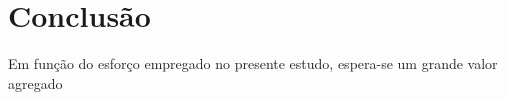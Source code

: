 \section{Conclusão}
\label{cap:conclusao}

Em função do esforço empregado no presente estudo, espera-se um grande valor agregado 
